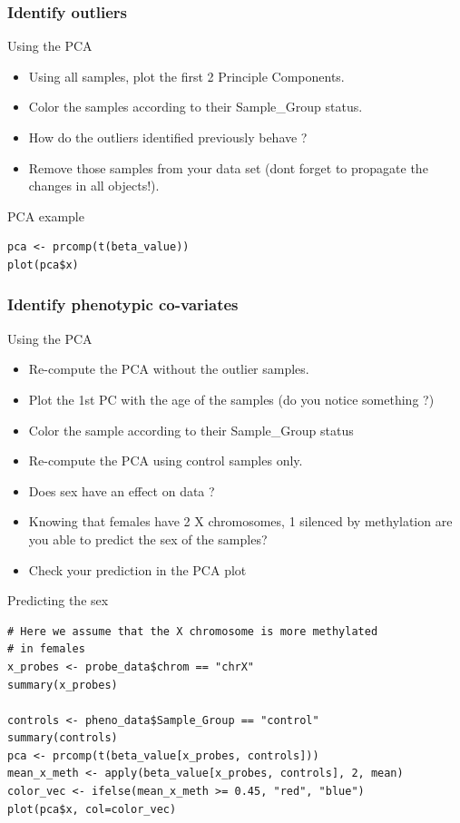 \documentclass[10pt]{beamer}
\newenvironment{xframe}[2][]
  {\begin{frame}[fragile,environment=xframe,#1]
  \frametitle{#2}}
  {\end{frame}}
\begin{document}
\begin{xframe}{Identify outliers}
  \begin{block}{Using the PCA}
    \begin{itemize}
      \item Using all samples, plot the first 2 Principle Components.
      \item Color the samples according to their Sample\_Group status. 
      \item How do the outliers identified previously behave ?
      \item Remove those samples from your data set (dont forget to propagate
      the changes in all objects!).
    \end{itemize}
  \end{block}
   \begin{exampleblock}{PCA example}
\begin{verbatim}
pca <- prcomp(t(beta_value))
plot(pca$x)
\end{verbatim}  
  \end{exampleblock}
\end{xframe}


\begin{xframe}{Identify phenotypic co-variates}
  \begin{block}{Using the PCA}
    \begin{itemize}
      \item Re-compute the PCA without the outlier samples.
      \item Plot the 1st PC with the age of the samples (do you notice
      something ?)
      \item Color the sample according to their Sample\_Group status
      \item Re-compute the PCA using {\sf control} samples only.
	  \item Does sex have an effect on data ?
	  \item Knowing that females have 2 X chromosomes, 1 silenced by methylation
	  are you able to predict the sex of the samples?
	  \item Check your prediction in the PCA plot
    \end{itemize}
      \end{block}
    \begin{exampleblock}{Predicting the sex}
\begin{verbatim}
# Here we assume that the X chromosome is more methylated
# in females
x_probes <- probe_data$chrom == "chrX"
summary(x_probes)

controls <- pheno_data$Sample_Group == "control"
summary(controls)
pca <- prcomp(t(beta_value[x_probes, controls]))
mean_x_meth <- apply(beta_value[x_probes, controls], 2, mean)
color_vec <- ifelse(mean_x_meth >= 0.45, "red", "blue")
plot(pca$x, col=color_vec)
\end{verbatim}  
  \end{exampleblock}   

\end{xframe}
\end{document}
